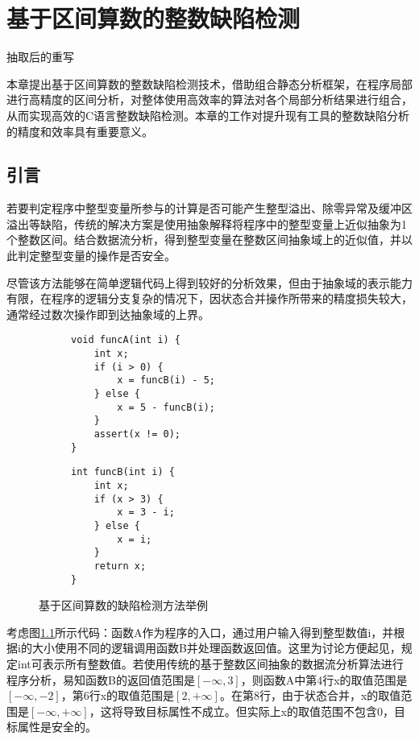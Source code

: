 
\chapter{基于区间算数的整数缺陷检测}

{\color{red} 抽取后的重写}

本章提出基于区间算数的整数缺陷检测技术，借助组合静态分析框架，在程序局部进行高精度的区间分析，对整体使用高效率的算法对各个局部分析结果进行组合，从而实现高效的C语言整数缺陷检测。本章的工作对提升现有工具的整数缺陷分析的精度和效率具有重要意义。

\section{引言}

若要判定程序中整型变量所参与的计算是否可能产生整型溢出、除零异常及缓冲区溢出等缺陷，传统的解决方案是使用抽象解释将程序中的整型变量上近似抽象为1个整数区间。结合数据流分析，得到整型变量在整数区间抽象域上的近似值，并以此判定整型变量的操作是否安全。

尽管该方法能够在简单逻辑代码上得到较好的分析效果，但由于抽象域的表示能力有限，在程序的逻辑分支复杂的情况下，因状态合并操作所带来的精度损失较大，通常经过数次操作即到达抽象域的上界。

\begin{figure}[htb]
	\begin{subfigure}[b]{.5\linewidth}
			\begin{lstlisting}[xleftmargin=.15\textwidth]
void funcA(int i) {
	int x;
	if (i > 0) {
		x = funcB(i) - 5;
	} else {
		x = 5 - funcB(i);
	}
	assert(x != 0);
}
			\end{lstlisting}
	\end{subfigure}
	\begin{subfigure}[b]{.5\linewidth}
			\begin{lstlisting}[xleftmargin=.25\textwidth]
int funcB(int i) {
	int x;
	if (x > 3) {
		x = 3 - i;
	} else {
		x = i;
	}
	return x;
}
			\end{lstlisting}
\end{subfigure}
	\caption{基于区间算数的缺陷检测方法举例}
	\label{fig:codeExampleForSignRange}
\end{figure}{\tiny }

考虑图\ref{fig:codeExampleForSignRange}所示代码：函数A作为程序的入口，通过用户输入得到整型数值i，并根据i的大小使用不同的逻辑调用函数B并处理函数返回值。这里为讨论方便起见，规定int可表示所有整数值。若使用传统的基于整数区间抽象的数据流分析算法进行程序分析，易知函数B的返回值范围是$ [-\infty, 3] $，则函数A中第4行x的取值范围是$ [-\infty, -2] $，第6行x的取值范围是$ [2, +\infty] $。在第8行，由于状态合并，x的取值范围是$ [-\infty, +\infty] $，这将导致目标属性不成立。但实际上x的取值范围不包含0，目标属性是安全的。

